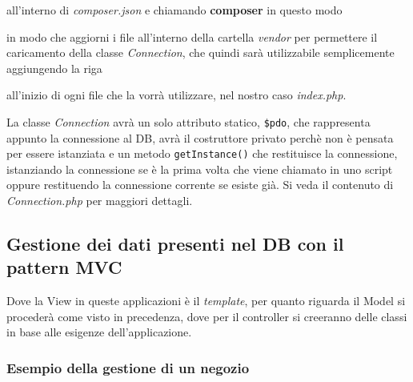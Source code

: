 all'interno di \emph{composer.json} e chiamando \textbf{composer} in
questo modo

\begin{Shaded}
\begin{Highlighting}[]
\end{Highlighting}
\end{Shaded}

in modo che aggiorni i file all'interno della cartella \emph{vendor} per
permettere il caricamento della classe \emph{Connection}, che quindi
sarà utilizzabile semplicemente aggiungendo la riga

\begin{Shaded}
\begin{Highlighting}[]
 \OtherTok{;}
\end{Highlighting}
\end{Shaded}

all'inizio di ogni file che la vorrà utilizzare, nel nostro caso
\emph{index.php}.

La classe \emph{Connection} avrà un solo attributo statico,
\texttt{\$pdo}, che rappresenta appunto la connessione al DB, avrà il
costruttore privato perchè non è pensata per essere istanziata e un
metodo \texttt{getInstance()} che restituisce la connessione,
istanziando la connessione se è la prima volta che viene chiamato in uno
script oppure restituendo la connessione corrente se esiste già. Si veda
il contenuto di \emph{Connection.php} per maggiori dettagli.

\hypertarget{gestione-dei-dati-presenti-nel-db-con-il-pattern-mvc}{%
\subsection{Gestione dei dati presenti nel DB con il pattern
MVC}\label{gestione-dei-dati-presenti-nel-db-con-il-pattern-mvc}}

Dove la View in queste applicazioni è il \emph{template}, per quanto
riguarda il Model si procederà come visto in precedenza, dove per il
controller si creeranno delle classi in base alle esigenze
dell'applicazione.

\hypertarget{esempio-della-gestione-di-un-negozio}{%
\subsubsection{Esempio della gestione di un
negozio}\label{esempio-della-gestione-di-un-negozio}}

